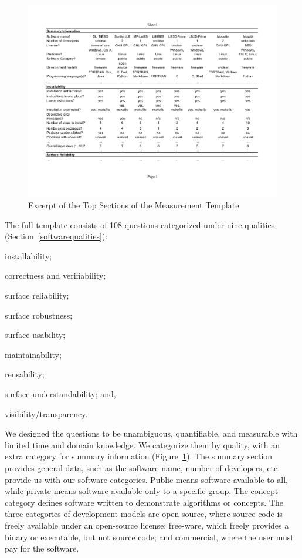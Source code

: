 \documentclass[final, 3p, times, authoryear]{elsarticle}
\begin{document}
\begin{figure}[!ht]
	\begin{center}
	  \includegraphics[width=1.0\textwidth]{./figures/measurement_template.pdf}
	  \caption{Excerpt of the Top Sections of the Measurement Template}
	  \label{measurement_template_image}
	\end{center}
\end{figure}

The full template consists of 108 questions categorized under nine qualities
(Section~\ref{softwarequalities}):
\begin{inparaenum}[(i)]
	\item installability;
	\item correctness and verifiability;
	\item surface reliability;
	\item surface robustness;
	\item surface usability;
	\item maintainability;
	\item reusability;
	\item surface understandability; and,
	\item visibility/transparency. 
\end{inparaenum} 

We designed the questions to be unambiguous, quantifiable, and measurable with
limited time and domain knowledge. We categorize them by quality, with an extra
category for summary information (Figure~\ref{measurement_template_image}). The
summary section provides general data, such as the software name, number of
developers, etc. \citet{gewaltig2012quality} provide us with our software
categories. Public means software available to all, while private means software
available only to a specific group.  The concept category defines software
written to demonstrate algorithms or concepts. The three categories of
development models are open source, where source code is freely available under
an open-source license; free-ware, which freely provides a binary or executable,
but not source code; and commercial, where the user must pay for the software. 
\end{document}
